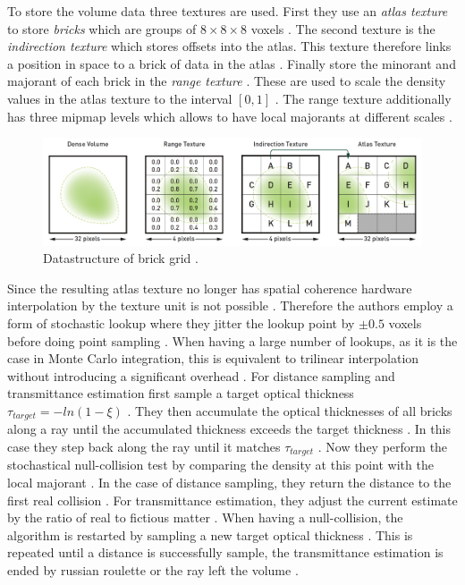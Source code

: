 To store the volume data three textures are used.
First they use an \textit{atlas texture} to store \textit{bricks} which are groups of $8 \times 8 \times 8$ voxels \cite[p. 4]{brick_grid}.
The second texture is the \textit{indirection texture} which stores offsets into the atlas.
This texture therefore links a position in space to a brick of data in the atlas \cite[p. 4]{brick_grid}.
Finally \citeauthor{brick_grid} store the minorant and majorant of each brick in the \textit{range texture} \cite[p. 4]{brick_grid}.
These are used to scale the density values in the atlas texture to the interval $[0, 1]$ \cite[p. 4]{brick_grid}.
The range texture additionally has three mipmap levels which allows to have local majorants at different scales \cite[p. 7]{brick_grid}.
\begin{figure}[!ht]
    \centering
    \includegraphics[width=0.9\linewidth]{img/brick_grid_datastructure.png}
    \caption{Datastructure of brick grid \cite[p. 4]{brick_grid}.}
    \label{fig:brick_grid_datastructure}
\end{figure}
Since the resulting atlas texture no longer has spatial coherence hardware interpolation by the texture unit is not possible \cite[p. 5]{brick_grid}.
Therefore the authors employ a form of stochastic lookup where they jitter the lookup point by $\pm0.5$ voxels before doing point sampling \cite[p. 5]{brick_grid}.
When having a large number of lookups, as it is the case in Monte Carlo integration, this is equivalent to trilinear interpolation without introducing a significant overhead \cite[p. 5]{brick_grid}.
For distance sampling and transmittance estimation \citeauthor{brick_grid} first sample a target optical thickness $\tau_{target}=-ln(1-\xi)$ \cite[p. 6]{brick_grid}.
They then accumulate the optical thicknesses of all bricks along a ray until the accumulated thickness exceeds the target thickness \cite[p. 6]{brick_grid}.
In this case they step back along the ray until it matches $\tau_{target}$ \cite[p. 6]{brick_grid}.
Now they perform the stochastical null-collision test by comparing the density at this point with the local majorant \cite[p. 6]{brick_grid}.
In the case of distance sampling, they return the distance to the first real collision \cite[p. 6]{brick_grid}.
For transmittance estimation, they adjust the current estimate by the ratio of real to fictious matter \cite[p. 6]{brick_grid}.
When having a null-collision, the algorithm is restarted by sampling a new target optical thickness \cite[p. 6]{brick_grid}.
This is repeated until a distance is successfully sample, the transmittance estimation is ended by russian roulette or the ray left the volume \cite[p. 6]{brick_grid}.